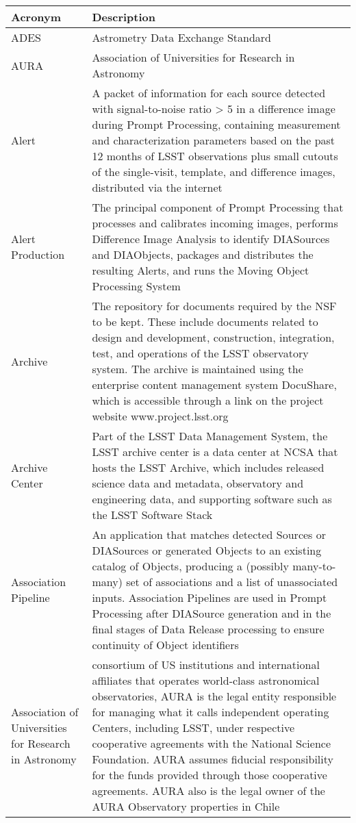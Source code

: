 \addtocounter{table}{-1}
\begin{longtable}{|p{}|p{}|}\hline
\textbf{Acronym} & \textbf{Description}  \\\hline

ADES & Astrometry Data Exchange Standard \\\hline
AURA & \gls{Association of Universities for Research in Astronomy} \\\hline
Alert & A packet of information for each source detected with signal-to-noise ratio > 5 in a difference image during \gls{Prompt Processing}, containing measurement and characterization parameters based on the past 12 months of \gls{LSST} observations plus small cutouts of the single-visit, template, and difference images, distributed via the internet \\\hline
Alert Production & The principal component of \gls{Prompt Processing} that processes and calibrates incoming images, performs \gls{Difference Image} Analysis to identify DIASources and DIAObjects, packages and distributes the resulting Alerts, and runs the Moving \gls{Object} Processing System \\\hline
Archive & The repository for documents required by the \gls{NSF} to be kept. These include documents related to design and development, construction, integration, test, and operations of the \gls{LSST} observatory system. The archive is maintained using the enterprise content management system \gls{DocuShare}, which is accessible through a link on the project website www.project.lsst.org \\\hline
Archive \gls{Center} & Part of the \gls{LSST} \gls{Data Management System}, the \gls{LSST} archive center is a data center at \gls{NCSA} that hosts the \gls{LSST} \gls{Archive}, which includes released science data and \gls{metadata}, observatory and engineering data, and supporting software such as the \gls{LSST} \gls{Software Stack} \\\hline
Association Pipeline & An application that matches detected Sources or DIASources or generated Objects to an existing catalog of Objects, producing a (possibly many-to-many) set of associations and a list of unassociated inputs. Association Pipelines are used in \gls{Prompt Processing} after \gls{DIASource} generation and in the final stages of \gls{Data Release} processing to ensure continuity of \gls{Object} identifiers \\\hline
Association of Universities for Research in Astronomy &  consortium of \gls{US} institutions and international affiliates that operates world-class astronomical observatories, \gls{AURA} is the legal entity responsible for managing what it calls independent operating Centers, including \gls{LSST}, under respective cooperative agreements with the \gls{National Science Foundation}. \gls{AURA} assumes fiducial responsibility for the funds provided through those cooperative agreements. \gls{AURA} also is the legal owner of the \gls{AURA} Observatory properties in Chile \\\hline

\end{longtable}
